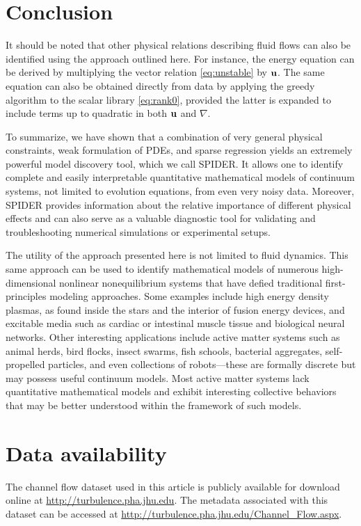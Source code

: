 \documentclass[
 reprint,
 amsmath,amssymb,
 aps,
]{revtex4-2}
\begin{document}
\section*{Conclusion}

It should be noted that other physical relations describing fluid flows can also be identified using the approach outlined here. For instance, the energy equation can be derived by multiplying the vector relation \eqref{eq:unstable} by ${\bf u}$. The same equation can also be obtained directly from data by applying the greedy algorithm to the scalar library \eqref{eq:rank0}, provided the latter is expanded to include terms up to quadratic in both ${\bf u}$ and $\nabla$.

To summarize, we have shown that a combination of very general physical constraints, weak formulation of PDEs, and sparse regression yields an extremely powerful model discovery tool, which we call SPIDER. It allows one to identify complete and easily interpretable quantitative mathematical models of continuum systems, not limited to evolution equations, from even very noisy data.
Moreover, SPIDER provides information about the relative importance of different physical effects and can also serve as a valuable diagnostic tool for validating and troubleshooting numerical simulations or experimental setups.

The utility of the approach presented here is not limited to fluid dynamics. This same approach can be used to identify mathematical models of numerous high-dimensional nonlinear nonequilibrium systems that have defied traditional first-principles modeling approaches. Some examples include high energy density plasmas, as found inside the stars and the interior of fusion energy devices, and excitable media such as cardiac or intestinal muscle tissue and biological neural networks. Other interesting applications include active matter systems such as animal herds, bird flocks, insect swarms, fish schools, bacterial aggregates, self-propelled particles, and even collections of robots---these are formally discrete but may possess useful continuum models. Most active matter systems lack quantitative mathematical models and exhibit interesting collective behaviors that may be better understood within the framework of such models.

\section*{Data availability}
The channel flow dataset used in this article is publicly available for download online at \url{http://turbulence.pha.jhu.edu}. The metadata associated with this dataset can be accessed at \url{http://turbulence.pha.jhu.edu/Channel_Flow.aspx}. 
\end{document}
